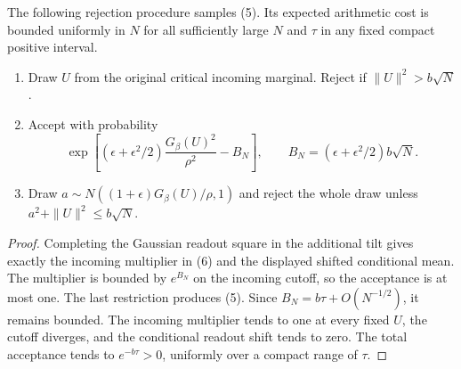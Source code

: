 \documentclass[11pt]{article}
\begin{document}
\begin{lemma}\label{lem:tilt}
The following rejection procedure samples (5). Its expected arithmetic
cost is bounded uniformly in $N$ for all sufficiently large $N$ and
$\tau$ in any fixed compact positive interval.
\begin{enumerate}
\item Draw $U$ from the original critical incoming marginal. Reject if
$\|U\|^2>b\sqrt N$.
\item Accept with probability
\[
 \exp\left[(\epsilon+\epsilon^2/2)\frac{G_\beta(U)^2}{\rho^2}-B_N\right],
 \qquad B_N=(\epsilon+\epsilon^2/2)b\sqrt N.              \tag{6}
\]
\item Draw $a\sim N((1+\epsilon)G_\beta(U)/\rho,1)$ and reject the
whole draw unless $a^2+\|U\|^2\le b\sqrt N$.
\end{enumerate}
\end{lemma}
\begin{proof}
Completing the Gaussian readout square in the additional tilt gives
exactly the incoming multiplier in (6) and the displayed shifted
conditional mean. The multiplier is bounded by $e^{B_N}$ on the incoming
cutoff, so the acceptance is at most one. The last restriction produces
(5). Since $B_N=b\tau+O(N^{-1/2})$, it remains bounded. The incoming
multiplier tends to one at every fixed $U$, the cutoff diverges, and
the conditional readout shift tends to zero. The total acceptance tends
to $e^{-b\tau}>0$, uniformly over a compact range of $\tau$.
\end{proof}
\end{document}
